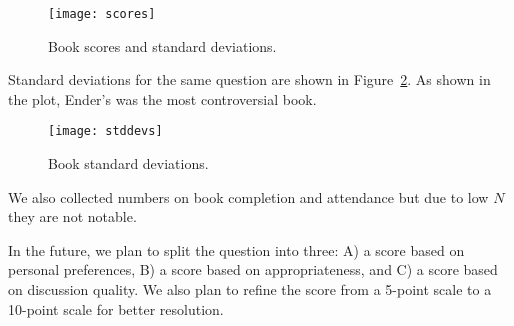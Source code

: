 \documentclass{article}
\newcommand{\PLOT}[1]{Figure~\ref{plot:#1}}
\begin{document}
\newcommand{\plotwidth}{0.9}

\begin{figure}
\texttt{[image: scores]}
\caption{Book scores and standard deviations.
  \label{plot:scores}}
\end{figure}

Standard deviations for the same question are shown in \PLOT{stddevs}.  As shown in the plot, Ender's was the most controversial book.

\begin{figure}
\texttt{[image: stddevs]}
\caption{Book standard deviations.
  \label{plot:stddevs}}
\end{figure}

We also collected numbers on book completion and attendance but due to low $N$ they are not notable.

In the future, we plan to split the question into three: A) a score based on personal preferences, B) a score based on appropriateness, and C) a score based on discussion quality.  We also plan to refine the score from a 5-point scale to a 10-point scale for better resolution.
\end{document}
